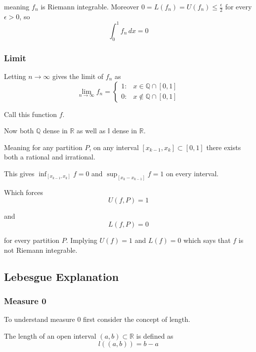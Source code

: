 \documentclass[12pt]{article}
\theoremstyle{plain}
\theoremstyle{definition}
\theoremstyle{definition}
\theoremstyle{remark}
\begin{document}
meaning $f_n$ is Riemann integrable. Moreover $0 = L(f_n) = U(f_n) \leq \frac{\epsilon}{2}$
for every $\epsilon > 0$, so
\begin{equation*}
    \int_{0}^{1} f_n \, dx = 0
\end{equation*}


\subsubsection{Limit}
Letting $n \to \infty$ gives the limit of $f_n$ as 
\begin{equation}
    \lim_{n \to \infty} f_n = \begin{cases}
                        1: & x \in \mathbb{Q} \cap [0, 1] \\
                        0: & x \not\in \mathbb{Q} \cap [0, 1]
                        \end{cases}
\end{equation}

Call this function $f$.

Now both $\mathbb{Q}$ dense in $\mathbb{R}$
as well as $\mathbb{I}$ dense in $\mathbb{R}$.

Meaning for any partition $P$, on any interval $[x_{k-1}, x_k] \subset [0, 1]$
there exists both a rational and irrational.

This gives $\inf_{[x_{k-1}, x_k]} f = 0$ and $\sup_{[x_k - x_{k-1}]} f = 1$ on every interval.

Which forces
\begin{equation*}
    U(f, P) = 1
\end{equation*}

and
\begin{equation*}
    L(f, P) = 0
\end{equation*}

for every partition $P$. Implying $U(f) = 1$ and $L(f) = 0$ which says that $f$ is
not Riemann integrable.


\subsection{Lebesgue Explanation}

\subsubsection{Measure 0}
To understand measure 0 first consider the concept of length.

\begin{definition}[Length]
    The length of an open interval $(a, b) \subset \mathbb{R}$ is defined as
    \begin{equation}
        l((a, b)) = b - a
    \end{equation}
\end{definition}
\end{document}

